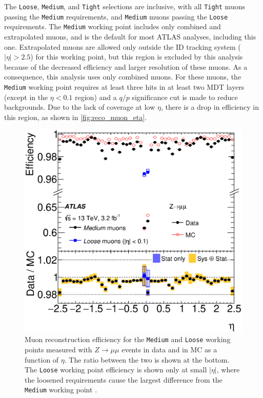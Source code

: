 The \texttt{Loose}, \texttt{Medium}, and \texttt{Tight} selections are inclusive, with all \texttt{Tight} muons passing the \texttt{Medium} requirements, and \texttt{Medium} muons passing the \texttt{Loose} requirements. %
The \texttt{Medium} working point includes only combined and extrapolated muons, and is the default for most \ac{ATLAS} analyses, including this one. Extrapolated muons are allowed only outside the \ac{ID} tracking system ($|\eta|>2.5$) for this working point, but this region is excluded by this analysis because of the decreased efficiency and larger \pt resolution of these muons. As a consequence, this analysis uses only combined muons. For these muons, the \texttt{Medium} working point requires at least three hits in at least two \ac{MDT} layers (except in the $\eta<0.1$ region) and a $q/p$ significance cut is made to reduce backgrounds. Due to the lack of coverage at low $\eta$, there is a drop in efficiency in this region, as shown in \autoref{fig:reco_muon_eta}. %

\begin{centering}
\begin{figure}[!hbt]
\myfloatalign
\includegraphics[width=.9\linewidth]{figures/reco/fig_03a.eps}
\caption{Muon reconstruction efficiency for the \texttt{Medium} and \texttt{Loose} working points measured with $Z\rightarrow\mu\mu$ events in data and in \ac{MC} as a function of $\eta$. The ratio between the two is shown at the bottom. The \texttt{Loose} working point efficiency is shown only at  small $|\eta|$, where the loosened requirements cause the largest difference from the \texttt{Medium} working point \cite{1603.05598}. }
\label{fig:reco_muon_eta}
\end{figure}
\end{centering}

